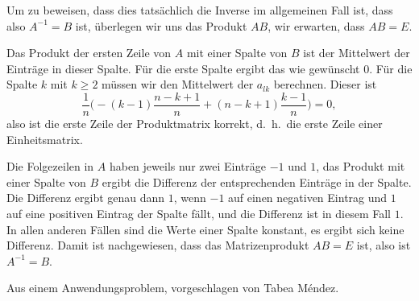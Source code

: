 \begin{loesung}
\begin{teilaufgaben}
Um zu beweisen, dass dies tatsächlich die Inverse im allgemeinen Fall ist,
dass also $A^{-1}=B$ ist, überlegen wir uns das Produkt $AB$,
wir erwarten, dass $AB=E$. 

Das Produkt der ersten Zeile von $A$ mit einer Spalte von $B$ ist der
Mittelwert der Einträge in dieser Spalte.
Für die erste Spalte ergibt das wie gewünscht $0$.
Für die Spalte $k$ mit $k\ge 2$ müssen wir den Mittelwert der $a_{lk}$ berechnen.
Dieser ist
\[
\frac1n\biggl(-(k-1)\frac{n-k+1}n+(n-k+1)\frac{k-1}n\biggr)
=0,
\]
also ist die erste Zeile der Produktmatrix korrekt, d.~h.~die erste Zeile
einer Einheitsmatrix.

Die Folgezeilen in $A$ haben jeweils nur zwei Einträge $-1$ und $1$,
das Produkt mit einer Spalte von $B$ ergibt die Differenz der entsprechenden
Einträge in der Spalte. Die Differenz ergibt genau dann $1$, wenn $-1$ 
auf einen negativen Eintrag und $1$ auf eine positiven Eintrag der Spalte
fällt, und die Differenz ist in diesem Fall $1$.
In allen anderen Fällen sind die Werte einer Spalte konstant, es ergibt sich
keine Differenz.
Damit ist nachgewiesen, dass das Matrizenprodukt $AB=E$ ist, also ist
$A^{-1}=B$.
\qedhere
\end{teilaufgaben}
\end{loesung}

\begin{diskussion}
Aus einem Anwendungsproblem, vorgeschlagen von Tabea M\'endez.
\end{diskussion}

